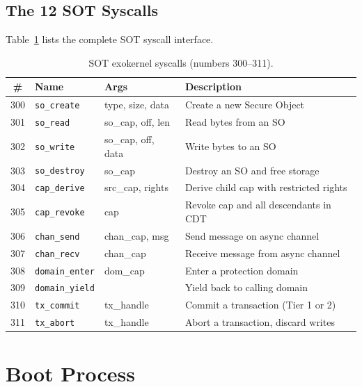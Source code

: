 \documentclass[11pt,a4paper,twoside]{report}
\theoremstyle{definition}
\newcommand{\syscall}[1]{\texttt{#1}}
\begin{document}
\section{The 12 SOT Syscalls}

Table~\ref{tab:sot-syscalls} lists the complete SOT syscall interface.

\begin{table}[H]
\centering
\caption{SOT exokernel syscalls (numbers 300--311).}
\label{tab:sot-syscalls}
\begin{tabularx}{\textwidth}{c l l X}
\toprule
\textbf{\#} & \textbf{Name} & \textbf{Args} & \textbf{Description} \\
\midrule
300 & \syscall{so\_create}    & type, size, data  & Create a new Secure Object \\
301 & \syscall{so\_read}      & so\_cap, off, len & Read bytes from an SO \\
302 & \syscall{so\_write}     & so\_cap, off, data & Write bytes to an SO \\
303 & \syscall{so\_destroy}   & so\_cap           & Destroy an SO and free storage \\
304 & \syscall{cap\_derive}   & src\_cap, rights   & Derive child cap with restricted rights \\
305 & \syscall{cap\_revoke}   & cap               & Revoke cap and all descendants in CDT \\
306 & \syscall{chan\_send}     & chan\_cap, msg     & Send message on async channel \\
307 & \syscall{chan\_recv}     & chan\_cap          & Receive message from async channel \\
308 & \syscall{domain\_enter}  & dom\_cap          & Enter a protection domain \\
309 & \syscall{domain\_yield}  &                   & Yield back to calling domain \\
310 & \syscall{tx\_commit}     & tx\_handle        & Commit a transaction (Tier 1 or 2) \\
311 & \syscall{tx\_abort}      & tx\_handle        & Abort a transaction, discard writes \\
\bottomrule
\end{tabularx}
\end{table}

\chapter{Boot Process}
\label{ch:boot}
\end{document}
